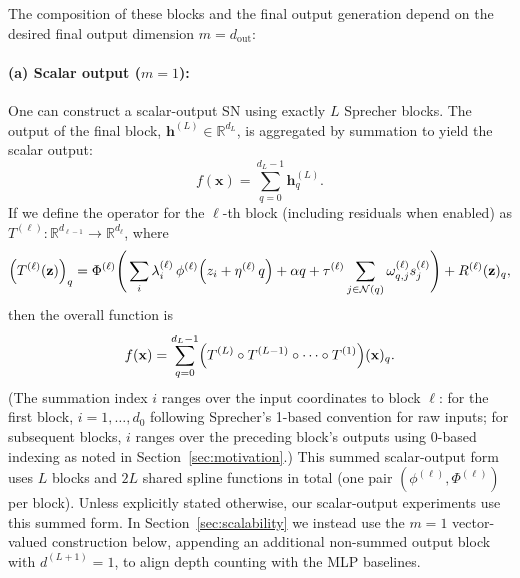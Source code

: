 \documentclass{article}
\theoremstyle{plain}
\theoremstyle{definition}
\theoremstyle{remark}
\begin{document}
The composition of these blocks and the final output generation depend on the desired final output dimension $m=d_{\mathrm{out}}$:

\paragraph{(a) Scalar output ($m=1$):}
One can construct a scalar-output SN using exactly $L$ Sprecher blocks. The output of the final block, $\mathbf{h}^{(L)} \in \mathbb{R}^{d_L}$, is aggregated by summation to yield the scalar output:
$$ f(\mathbf{x}) = \sum_{q=0}^{d_L-1} \mathbf{h}^{(L)}_q. $$
If we define the operator for the $\ell$-th block (including residuals when enabled) as $T^{(\ell)}: \mathbb{R}^{d_{\ell-1}} \to \mathbb{R}^{d_\ell}$, where
\begin{equation}\label{eq:SN_full}
\Bigl(T^{(\ell)}(\mathbf{z})\Bigr)_q = \Phi^{(\ell)}\Biggl(\,\sum_{i} \lambda^{(\ell)}_{i}\,\phi^{(\ell)}\Bigl(z_i+\eta^{(\ell)}\,q\Bigr) + \alpha q + \tau^{(\ell)} \sum_{j \in \mathcal{N}(q)} \omega_{q,j}^{(\ell)} s_j^{(\ell)}\Biggr) + R^{(\ell)}(\mathbf{z})_q,
\end{equation}
then the overall function is
$$ f(\mathbf{x}) = \sum_{q=0}^{d_L-1} \Bigl(T^{(L)} \circ T^{(L-1)} \circ \cdots \circ T^{(1)}\Bigr)(\mathbf{x})_q. $$
(The summation index $i$ ranges over the input coordinates to block $\ell$: for the first block, $i=1,\ldots,d_0$ following Sprecher's 1-based convention for raw inputs; for subsequent blocks, $i$ ranges over the preceding block's outputs using 0-based indexing as noted in Section~\ref{sec:motivation}.)
This summed scalar-output form uses $L$ blocks and $2L$ shared spline functions in total (one pair $(\phi^{(\ell)}, \Phi^{(\ell)})$ per block). Unless explicitly stated otherwise, our scalar-output experiments use this summed form. In Section~\ref{sec:scalability} we instead use the $m=1$ vector-valued construction below, appending an additional non-summed output block with $d^{(L+1)}=1$, to align depth counting with the MLP baselines.
\end{document}
